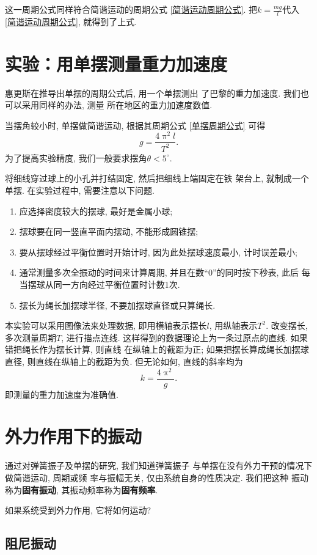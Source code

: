 \documentclass[11pt,a4paper]{ctexbook}
\begin{document}
这一周期公式同样符合简谐运动的周期公式 \eqref{简谐运动周期公式}.
把$k = \displaystyle\frac{mg}{l}$代入 \eqref{简谐运动周期公式},
就得到了上式.

\section{实验：用单摆测量重力加速度}

惠更斯在推导出单摆的周期公式后, 用一个单摆测出
了巴黎的重力加速度. 我们也可以采用同样的办法, 测量
所在地区的重力加速度数值.

当摆角较小时, 单摆做简谐运动, 根据其周期公式 \eqref{单摆周期公式}
可得
$$g = \frac{4\uppi^2l}{T^2}.$$
为了提高实验精度, 我们一般要求摆角$\theta<5^{\circ}$.

将细线穿过球上的小孔并打结固定, 然后把细线上端固定在铁
架台上, 就制成一个单摆. 在实验过程中, 需要注意以下问题.
\begin{enumerate}
    \item 应选择密度较大的摆球, 最好是金属小球;
    \item 摆球要在同一竖直平面内摆动, 不能形成圆锥摆;
    \item 要从摆球经过平衡位置时开始计时, 因为此处摆球速度最小, 计时误差最小;
    \item 通常测量多次全振动的时间来计算周期, 并且在数``0''的同时按下秒表, 此后
    每当摆球从同一方向经过平衡位置时计数1次.
    \item 摆长为绳长加摆球半径, 不要加摆球直径或只算绳长.
\end{enumerate}

本实验可以采用图像法来处理数据, 即用横轴表示摆长$l$, 用纵轴表示$T^2$.
改变摆长, 多次测量周期$T$, 进行描点连线. 这样得到的数据理论上为一条过原点的直线. 如果错把绳长作为摆长计算, 则直线
在纵轴上的截距为正; 如果把摆长算成绳长加摆球直径, 则直线在纵轴上的截距为负.
但无论如何, 直线的斜率均为$$k = \frac{4\uppi^2}{g}.$$即测量的重力加速度为准确值.

\section{外力作用下的振动}

通过对弹簧振子及单摆的研究, 我们知道弹簧振子
与单摆在没有外力干预的情况下做简谐运动, 周期或频
率与振幅无关, 仅由系统自身的性质决定. 我们把这种
振动称为\textbf{固有振动}, 其振动频率称为\textbf{固有频率}.

如果系统受到外力作用, 它将如何运动?

\subsection{阻尼振动}
\end{document}
